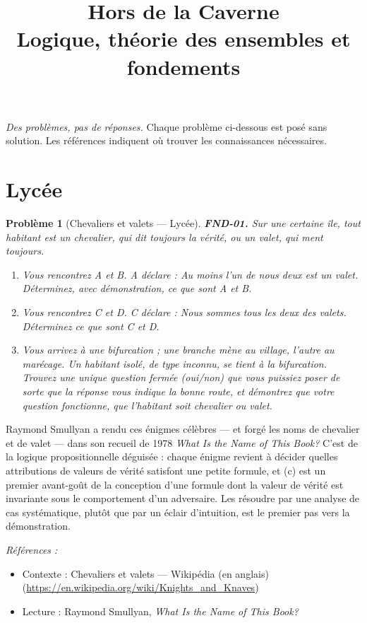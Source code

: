 \documentclass[11pt]{article}
\title{Hors de la Caverne \\ \Large Logique, théorie des ensembles et fondements}
\author{}
\date{}
\newtheorem{problem}{Problème}
\newenvironment{refs}{\par\small\noindent\emph{Références :}\begin{itemize}\setlength\itemsep{0pt}}{\end{itemize}\normalsize}
\begin{document}
\maketitle
\noindent\emph{Des problèmes, pas de réponses.} Chaque problème ci-dessous est posé
sans solution. Les références indiquent où trouver les connaissances nécessaires.
\medskip


\section*{Lycée}

\begin{problem}[{Chevaliers et valets --- Lycée}]
\textbf{FND-01.} Sur une certaine île, tout habitant est un \textit{chevalier},
qui dit toujours la vérité, ou un \textit{valet}, qui ment toujours.
\begin{enumerate}
\item[(a)] Vous rencontrez A et B. A déclare :
\og{} Au moins l'un de nous deux est un valet. \fg{} Déterminez, avec démonstration, ce que sont A et B.
\item[(b)] Vous rencontrez C et D.
C déclare : \og{} Nous sommes tous les deux des valets. \fg{} Déterminez ce que sont C et D.
\item[(c)] Vous arrivez à une bifurcation ; une
branche mène au village, l'autre au marécage. Un habitant isolé, de type inconnu, se tient
à la bifurcation. Trouvez une unique question fermée (oui/non) que vous puissiez poser de sorte que
la réponse vous indique la bonne route, et démontrez que votre question fonctionne, que
l'habitant soit chevalier ou valet.
\end{enumerate}

\end{problem}

\noindent Raymond Smullyan a rendu ces énigmes célèbres --- et forgé les noms de chevalier
et de valet --- dans son recueil de 1978 \textit{What Is the Name of This Book?} C'est de la logique
propositionnelle déguisée : chaque énigme revient à décider quelles attributions de valeurs de
vérité satisfont une petite formule, et (c) est un premier avant-goût de la conception d'une
formule dont la valeur de vérité est invariante sous le comportement d'un adversaire. Les
résoudre par une analyse de cas systématique, plutôt que par un éclair d'intuition, est le
premier pas vers la démonstration.

\begin{refs}
\item Contexte : Chevaliers et valets --- Wikipédia (en anglais) (\url{https://en.wikipedia.org/wiki/Knights_and_Knaves})
\item Lecture : Raymond Smullyan, \textit{What Is the Name of This Book?}
\end{refs}
\end{document}
